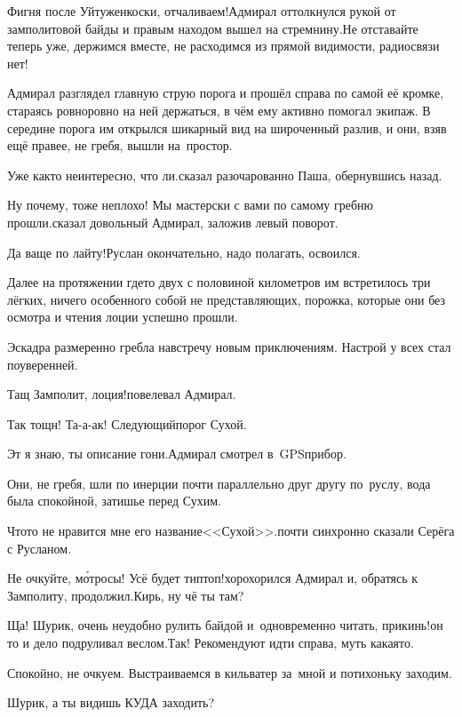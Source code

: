 \diagdash Фигня после Уйтуженкоски, отчаливаем!\mdash Адмирал оттолкнулся рукой от замполитовой байды и правым находом вышел на стремнину.\mdash Не отставайте теперь уже, держимся вместе, не расходимся из прямой видимости, радиосвязи нет!

Адмирал разглядел главную струю порога и прошёл справа по самой её кромке, стараясь ровно\sdash ровно на ней держаться, в чём ему активно помогал экипаж. В середине порога им открылся шикарный вид на широченный разлив, и они, взяв ещё правее, не гребя, вышли на~простор.

\diagdash Уже как\sdash то неинтересно, что ли.\mdash сказал разочарованно Паша, обернувшись назад.

\diagdash Ну почему, тоже неплохо! Мы мастерски с вами по самому гребню прошли.\mdash сказал довольный Адмирал, заложив левый поворот.

\diagdash Да ваще по лайту!\mdash Руслан окончательно, надо полагать, освоился.

Далее на протяжении где\sdash то двух с половиной километров им встретилось три лёгких, ничего особенного собой не представляющих, порожка, которые они без осмотра и чтения лоции успешно прошли.

Эскадра размеренно гребла навстречу новым приключениям. Настрой у всех стал поуверенней.

\diagdash Тащ Замполит, лоция!\mdash повелевал Адмирал.

\diagdash Так тощн! Та-а-ак! Следующий\mdash порог Сухой.

\diagdash Эт я знаю, ты описание гони.\mdash Адмирал смотрел в~GPS\sdash прибор.

Они, не гребя, шли по инерции почти параллельно друг другу по~руслу, вода была спокойной, затишье перед Сухим.

\diagdash Что\sdash то не нравится мне его название\mdash <<Сухой>>.\mdash почти синхронно сказали Серёга с Русланом.

\diagdash Не очкуйте, м\'{о}тросы! Усё будет тип\sdash топ!\mdash хорохорился Адмирал и, обратясь к Замполиту, продолжил.\mdash Кирь, ну чё ты там?

\diagdash Ща! Шурик, очень неудобно рулить байдой и~одновременно читать, прикинь!\mdash он то и дело подруливал веслом.\mdash Так! Рекомендуют идти справа, муть какая\sdash то.

\diagdash Спокойно, не очкуем. Выстраиваемся в кильватер за~мной и потихоньку заходим. 

\diagdash Шурик, а ты видишь КУДА заходить?

